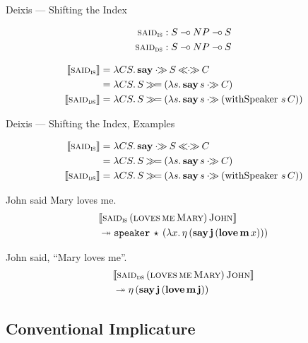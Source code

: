 \documentclass{beamer}
\begin{document}
\begin{frame}{Deixis --- Shifting the Index}
  
\begin{align*}
  \textsc{said}_{\textsc{is}} &: S \mathbin{{-}\mkern-3.5mu{\circ}} NP \mathbin{{-}\mkern-3.5mu{\circ}} S \\
  \textsc{said}_{\textsc{ds}} &: S \mathbin{{-}\mkern-3.5mu{\circ}} NP \mathbin{{-}\mkern-3.5mu{\circ}} S
\end{align*}

\begin{align*}
  \sem{\abs{said}_{\abs{is}}} &= \lam{C S}{\obj{say} \apr S \aplr C} \\
                              &= \lam{C S}{S \hsbind (\lam{s}{\ap{\obj{say}}{s} \apr C})} \\
  \sem{\abs{said}_{\abs{ds}}} &= \lam{C S}{S \hsbind (\lam{s}{\ap{\obj{say}}{s} \apr (\app{\withSpeaker}{s}{C})})}
\end{align*}
\end{frame}


\begin{frame}{Deixis --- Shifting the Index, Examples}

\begin{align*}
  \sem{\abs{said}_{\abs{is}}} &= \lam{C S}{\obj{say} \apr S \aplr C} \\
                              &= \lam{C S}{S \hsbind (\lam{s}{\ap{\obj{say}}{s} \apr C})} \\
  \sem{\abs{said}_{\abs{ds}}} &= \lam{C S}{S \hsbind (\lam{s}{\ap{\obj{say}}{s} \apr (\app{\withSpeaker}{s}{C})})}
\end{align*}

John said Mary loves me.
\begin{align*}
  & \llbracket \textsc{said}_{\textsc{is}}\,(\textsc{loves}\,\textsc{me}\,\textsc{Mary})\,\textsc{John} \rrbracket \\
  & \twoheadrightarrow \mathtt{speaker}\,\star\,(\lambda x.\, \eta\,(\textbf{say}\,\textbf{j}\,(\textbf{love}\,\textbf{m}\,x)))
\end{align*}

John said, ``Mary loves me''.
\begin{align*}
  & \llbracket \textsc{said}_{\textsc{ds}}\,(\textsc{loves}\,\textsc{me}\,\textsc{Mary})\,\textsc{John} \rrbracket \\
  & \twoheadrightarrow \eta\,(\textbf{say}\,\textbf{j}\,(\textbf{love}\,\textbf{m}\,\textbf{j}))
\end{align*}
\end{frame}


\subsection{Conventional Implicature}
\end{document}
